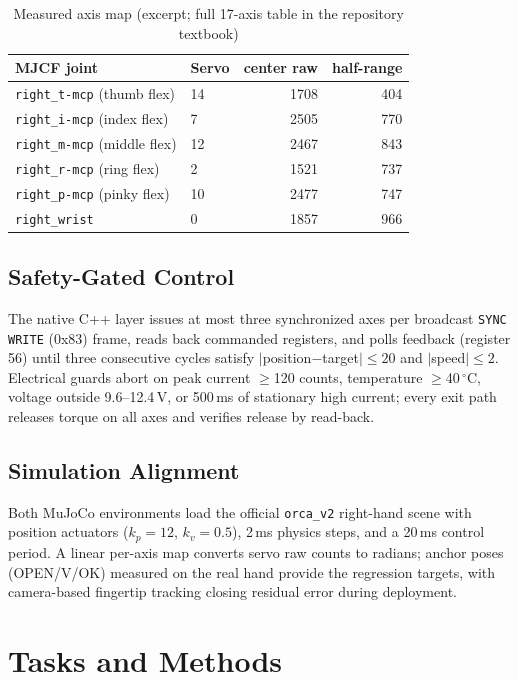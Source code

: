 \documentclass[conference]{IEEEtran}
\newcommand{\code}[1]{\texttt{#1}}
\begin{document}
\begin{table}[!t]
\caption{Measured axis map (excerpt; full 17-axis table in the repository textbook)}
\label{tab:map}
\centering\small
\begin{tabular}{@{}llrr@{}}
\toprule
MJCF joint & Servo & center raw & half-range \\
\midrule
\code{right\_t-mcp} (thumb flex) & 14 & 1708 & 404 \\
\code{right\_i-mcp} (index flex) & 7 & 2505 & 770 \\
\code{right\_m-mcp} (middle flex) & 12 & 2467 & 843 \\
\code{right\_r-mcp} (ring flex) & 2 & 1521 & 737 \\
\code{right\_p-mcp} (pinky flex) & 10 & 2477 & 747 \\
\code{right\_wrist} & 0 & 1857 & 966 \\
\bottomrule
\end{tabular}
\end{table}

\subsection{Safety-Gated Control}
The native C++ layer issues at most three synchronized axes per broadcast
\code{SYNC WRITE} (0x83) frame, reads back commanded registers, and polls
feedback (register 56) until three consecutive cycles satisfy
$|$position$-$target$|\le 20$ and $|$speed$|\le 2$. Electrical guards abort
on peak current $\ge$120 counts, temperature $\ge$40\,$^\circ$C, voltage
outside 9.6--12.4\,V, or 500\,ms of stationary high current; every exit path
releases torque on all axes and verifies release by read-back.

\subsection{Simulation Alignment}
Both MuJoCo environments load the official \code{orca\_v2} right-hand scene
with position actuators ($k_p{=}12$, $k_v{=}0.5$), 2\,ms physics steps, and a
20\,ms control period. A linear per-axis map converts servo raw counts to
radians; anchor poses (OPEN/V/OK) measured on the real hand provide the
regression targets, with camera-based fingertip tracking closing residual
error during deployment.

\section{Tasks and Methods}\label{sec:tasks}
\end{document}
